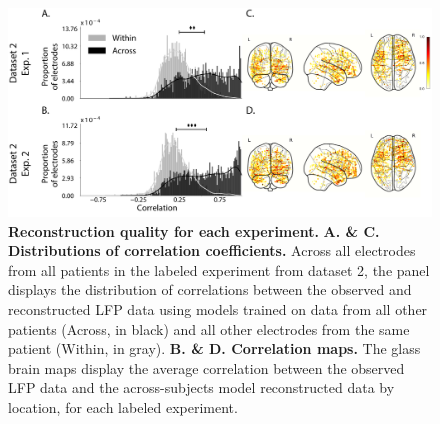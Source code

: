 \documentclass{article}
\begin{document}
\begin{figure}[ptb]
\centering
\includegraphics[width=\textwidth]{figs/supplemental_3}
\caption{\small \textbf{Reconstruction quality for each experiment.} \textbf{A. \& C.  Distributions
      of correlation coefficients.}  Across all electrodes from all
    patients in the labeled experiment from dataset 2, the panel displays the distribution of correlations between the observed and reconstructed LFP data using models trained on data from all other patients (Across, in black) and all other electrodes from the same patient (Within, in gray). 
    \textbf{B. \& D. Correlation maps.}  The glass brain maps display the
    average correlation between the observed LFP data and the across-subjects model reconstructed data by location, for each labeled experiment.}
\label{fig:supplemental_3}
\end{figure}
\end{document}
